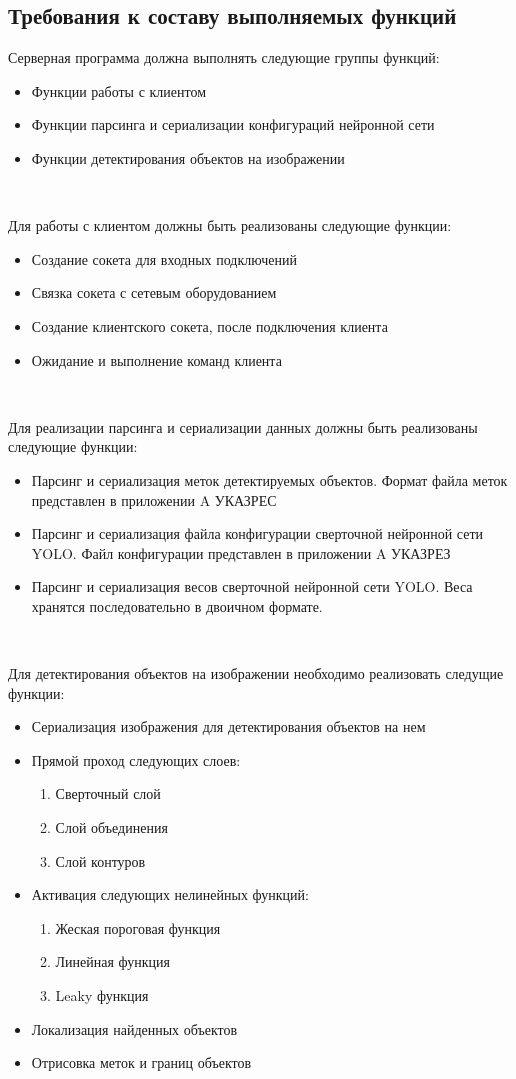 \documentclass[a4paper,english]{G2-105}
\begin{document}
\subsection{Требования к составу выполняемых функций}
\par Серверная программа должна выполнять следующие группы функций:
\begin{itemize}
\item Функции работы с клиентом
\item Функции парсинга и сериализации конфигураций нейронной сети
\item Функции детектирования объектов на изображении
\end{itemize}
~\ 
\par Для работы с клиентом должны быть реализованы следующие функции:
\begin{itemize}
\item Создание сокета для входных подключений
\item Связка сокета с сетевым оборудованием
\item Создание клиентского сокета, после подключения клиента
\item Ожидание и выполнение команд клиента
\end{itemize}
~\ 
\par Для реализации парсинга и сериализации данных должны быть реализованы следующие функции:
\begin{itemize}
\item Парсинг и сериализация меток детектируемых объектов. Формат файла меток представлен в приложении A УКАЗРЕС
\item Парсинг и сериализация файла конфигурации сверточной нейронной сети YOLO. Файл конфигурации представлен в приложении A УКАЗРЕЗ
\item Парсинг и сериализация весов сверточной нейронной сети YOLO. Веса хранятся последовательно в двоичном формате.
\end{itemize}
~\ 
\par Для детектирования объектов на изображении необходимо реализовать следущие функции:
\begin{itemize}
\item Сериализация изображения для детектирования объектов на нем
\item Прямой проход следующих слоев:
\begin{enumerate}
\item Сверточный слой
\item Слой объединения
\item Слой контуров
\end{enumerate}
\item Активация следующих нелинейных функций:
\begin{enumerate}
\item Жеская пороговая функция
\item Линейная функция
\item Leaky функция
\end{enumerate}
\item Локализация найденных объектов
\item Отрисовка меток и границ объектов
\end{itemize}
\end{document}
